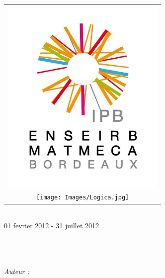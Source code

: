 
\begin{titlepage}
\begin{center}
  
  \begin{center}
    \begin{tabular}{c}
      
      \includegraphics [width=80mm]{Images/ENSEIRB-MATMECA.jpg} \\
      
      
      
         
      \texttt{[image: Images/Logica.jpg]}\\
      
      
    \end{tabular}
    
    
      
    \textsc{\Large \reportsubject}\\[0.5cm]
           {\large 01 fevrier 2012 - 31 juillet 2012}\\
           
           
           \HRule \\[0.4cm]
                  {\huge \bfseries \reporttitle}\\[0.4cm]
                  \HRule \\[1.5cm]
                  
                  \begin{center}
                    
                    \begin{flushleft} 
                      \large
                      \emph{Auteur :}\\
                      \reportauthor
                    \end{flushleft}
                    

\end{center}
\end{center}
\end{center}
\end{titlepage}
